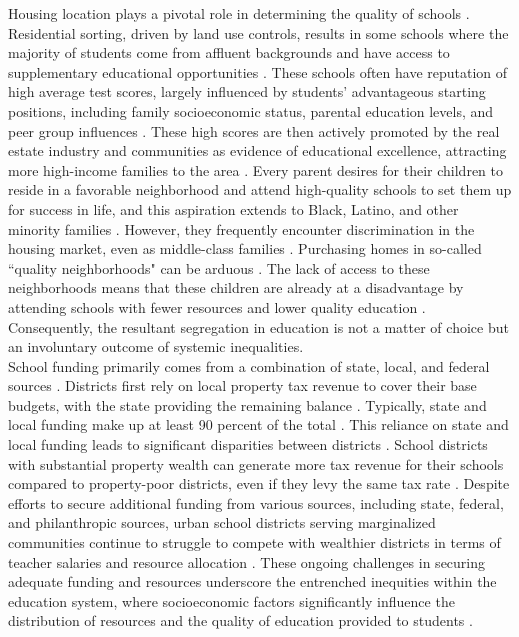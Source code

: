 \documentclass[sn-mathphys-num]{sn-jnl}%
\theoremstyle{thmstyleone}%
\theoremstyle{thmstyletwo}%
\theoremstyle{thmstylethree}%
\begin{document}
Housing location plays a pivotal role in determining the quality of schools \cite{orfield2006vicious}. Residential sorting, driven by land use controls, results in some schools where the majority of students come from affluent backgrounds and have access to supplementary educational opportunities \cite{orfield2006vicious}. These schools often have reputation of high average test scores, largely influenced by students' advantageous starting positions, including family socioeconomic status, parental education levels, and peer group influences \cite{orfield2006vicious}. These high scores are then actively promoted by the real estate industry and communities as evidence of educational excellence, attracting more high-income families to the area \cite{orfield2006vicious}. Every parent desires for their children to reside in a favorable neighborhood and attend high-quality schools to set them up for success in life, and this aspiration extends to Black, Latino, and other minority families \cite{carter2013closing, pattillo2018black}. However, they frequently encounter discrimination in the housing market, even as middle-class families \cite{carter2013closing, orfield2006vicious, pattillo2018black}. Purchasing homes in so-called ``quality neighborhoods" can be arduous \cite{orfield2006vicious}. The lack of access to these neighborhoods means that these children are already at a disadvantage by attending schools with fewer resources and lower quality education \cite{orfield2006vicious, carter2013closing, pattillo2018black}. Consequently, the resultant segregation in education is not a matter of choice but an involuntary outcome of systemic inequalities\cite{carter2013closing, orfield2006vicious}.\\

School funding primarily comes from a combination of state, local, and federal sources \cite{texas_tribune_school_funding, hanushek2009schoolhouses}. Districts first rely on local property tax revenue to cover their base budgets, with the state providing the remaining balance \cite{hanushek2009schoolhouses}. Typically, state and local funding make up at least 90 percent of the total \cite{hanushek2009schoolhouses}. This reliance on state and local funding leads to significant disparities between districts \cite{carter2013closing, orfield2006vicious, hanushek2009schoolhouses}. School districts with substantial property wealth can generate more tax revenue for their schools compared to property-poor districts, even if they levy the same tax rate \cite{hanushek2009schoolhouses}. Despite efforts to secure additional funding from various sources, including state, federal, and philanthropic sources, urban school districts serving marginalized communities continue to struggle to compete with wealthier districts in terms of teacher salaries and resource allocation \cite{wilkins2006yes, wiener2007opportunity, carter2013closing}. These ongoing challenges in securing adequate funding and resources underscore the entrenched inequities within the education system, where socioeconomic factors significantly influence the distribution of resources and the quality of education provided to students \cite{carter2013closing, hanushek2009schoolhouses}.\\
\end{document}
